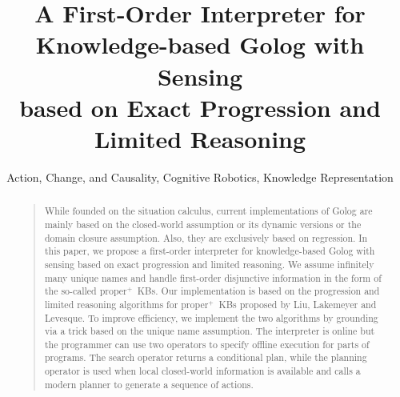 \documentclass[letterpaper]{article}
\newcommand{\properplus}{\mbox{proper$^+$}}
\begin{document}
%
\title{A First-Order Interpreter for Knowledge-based Golog with Sensing\\ based on Exact Progression and Limited Reasoning}
\author{Action, Change, and Causality, Cognitive Robotics, Knowledge Representation
}
\maketitle
\begin{abstract}
\begin{quote}
While founded on the situation calculus, current implementations of Golog are mainly based on the closed-world assumption or its dynamic versions or the domain closure assumption. Also, they are exclusively based on regression. In this paper, we propose a first-order interpreter for knowledge-based Golog with sensing based on exact progression and limited reasoning. We assume infinitely many unique names and handle first-order disjunctive information in the form of the so-called \properplus\ KBs. Our implementation is based on the progression and limited reasoning algorithms for \properplus\ KBs proposed by Liu, Lakemeyer and Levesque. To improve efficiency, we implement the two algorithms by grounding via a trick based on the unique name assumption.
The interpreter is online but the programmer can use two operators to specify offline execution for parts of programs. The search operator returns a conditional plan, while the planning operator is used when local closed-world information is available and calls a modern planner to generate a sequence of actions.

\end{quote}
\end{abstract}
\end{document}
